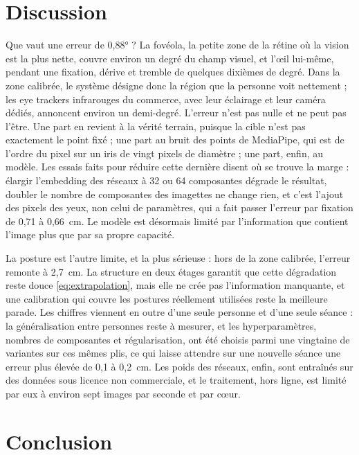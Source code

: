 \documentclass[10pt,a4paper]{article}
\begin{document}
\section{Discussion}\label{sec:discussion}

Que vaut une erreur de 0,88° ? La fovéola, la petite zone de la rétine où la vision est la plus nette, couvre environ un degré du champ visuel, et l'œil lui-même, pendant une fixation, dérive et tremble de quelques dixièmes de degré. Dans la zone calibrée, le système désigne donc la région que la personne voit nettement ; les eye trackers infrarouges du commerce, avec leur éclairage et leur caméra dédiés, annoncent environ un demi-degré. L'erreur n'est pas nulle et ne peut pas l'être. Une part en revient à la vérité terrain, puisque la cible n'est pas exactement le point fixé ; une part au bruit des points de MediaPipe, qui est de l'ordre du pixel sur un iris de vingt pixels de diamètre ; une part, enfin, au modèle. Les essais faits pour réduire cette dernière disent où se trouve la marge : élargir l'embedding des réseaux à 32 ou 64 composantes dégrade le résultat, doubler le nombre de composantes des imagettes ne change rien, et c'est l'ajout des pixels des yeux, non celui de paramètres, qui a fait passer l'erreur par fixation de 0,71 à 0,66~cm. Le modèle est désormais limité par l'information que contient l'image plus que par sa propre capacité.

La posture est l'autre limite, et la plus sérieuse : hors de la zone calibrée, l'erreur remonte à 2,7~cm. La structure en deux étages garantit que cette dégradation reste douce \eqref{eq:extrapolation}, mais elle ne crée pas l'information manquante, et une calibration qui couvre les postures réellement utilisées reste la meilleure parade. Les chiffres viennent en outre d'une seule personne et d'une seule séance : la généralisation entre personnes reste à mesurer, et les hyperparamètres, nombres de composantes et régularisation, ont été choisis parmi une vingtaine de variantes sur ces mêmes plis, ce qui laisse attendre sur une nouvelle séance une erreur plus élevée de 0,1 à 0,2~cm. Les poids des réseaux, enfin, sont entraînés sur des données sous licence non commerciale, et le traitement, hors ligne, est limité par eux à environ sept images par seconde et par cœur.

\section{Conclusion}
\end{document}
